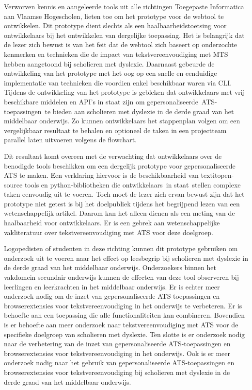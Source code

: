 \medspace

Verworven kennis en aangeleerde tools uit alle richtingen Toegepaste Informatica aan Vlaamse Hogescholen, lieten toe om het prototype voor de webtool te ontwikkelen. Dit prototype dient slechts als een haalbaarheidstoetsing voor ontwikkelaars bij het ontwikkelen van dergelijke toepassing. Het is belangrijk dat de lezer zich bewust is van het feit dat de webtool zich baseert op onderzochte kenmerken en technieken die de impact van tekstvereenvoudiging met MTS hebben aangetoond bij scholieren met dyslexie. Daarnaast gebeurde de ontwikkeling van het prototype met het oog op een snelle en eenduidige implementatie van technieken die voordien enkel beschikbaar waren via CLI. Tijdens de ontwikkeling van het prototype is gebleken dat ontwikkelaars met vrij beschikbare middelen en API's in staat zijn om gepersonaliseerde ATS-toepassingen te bieden aan scholieren met dyslexie in de derde graad van het middelbaar onderwijs. Zo kunnen ontwikkelaars het stappenplan volgen om een vergelijkbaar resultaat te behalen en optioneel de taken in een projectteam parallel laten uitvoeren volgens de flowchart.

\medspace

Dit resultaat komt overeen met de verwachting dat ontwikkelaars over de benodigde tools beschikken om een dergelijk prototype voor gepersonaliseerde ATS te maken. Een verklaring hiervoor is de beschikbaarheid van textit{open-source} tools en python-bibliotheken die ontwikkelaars in staat stellen complexe taken eenvoudig uit te voeren. Toch moet de lezer zich ervan bewust zijn dat het prototype niet getest is bij het doelpubliek tijdens het begrijpend lezen van een wetenschappelijk artikel. Daarom kan het alleen dienen als een meting van de haalbaarheid voor ontwikkelaars. Er is een gebrek aan wetenschappelijke vakliteratuur over tekstvereenvoudiging met ATS voor deze doelgroep.

\medspace

Logopedisten of studenten in deze richting kunnen dit prototype gebruiken om onderzoek uit te voeren naar het effect op leesbegrip bij scholieren met dyslexie in de derde graad van het middelbaar onderwijs. Onderzoekers binnen het vakdomein secundair onderwijs kunnen de effecten van deze tool observeren bij leerlingen en leerkrachten in het middelbaar onderwijs. Er is echter meer onderzoek nodig om de inzet van gepersonaliseerde ATS-toepassingen en browserextensies voor tekstvereenvoudiging in het onderwijs te verbeteren. Er is behoefte aan een toepassing die alle functionaliteiten kan combineren. Bovendien is er behoefte aan meer onderzoek naar tekstvereenvoudiging met ATS voor de specifieke doelgroep van scholieren met dyslexie. Ten slotte is er onderzoek nodig naar de verbetering van de inzet van gepersonaliseerde ATS-toepassingen en browserextensies voor tekstvereenvoudiging in het onderwijs. Ook is er meer onderzoek nodig naar het gebruik van gepersonaliseerde ATS-toepassingen en browserextensies voor tekstvereenvoudiging bij scholieren met dyslexie in de derde graad van het middelbaar onderwijs.